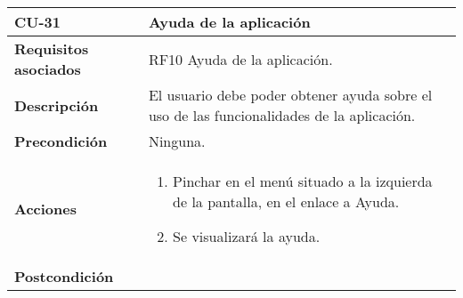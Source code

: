 \newpage
\begin{longtable}[t]{@{}ll@{}}
\toprule
\begin{minipage}[t]{0.23\columnwidth}\raggedright\strut
\textbf{CU-31}\strut
\end{minipage} & \begin{minipage}[b]{0.71\columnwidth}\raggedright\strut
\textbf{Ayuda de la aplicación}\strut
\end{minipage}\tabularnewline
\midrule
\endhead
\begin{minipage}[t]{0.23\columnwidth}\raggedright\strut
\textbf{Requisitos asociados}\strut
\end{minipage} & \begin{minipage}[t]{0.71\columnwidth}\raggedright\strut
RF10 Ayuda de la aplicación. \strut
\end{minipage}\tabularnewline
\begin{minipage}[t]{0.23\columnwidth}\raggedright\strut
\textbf{Descripción}\strut
\end{minipage} & \begin{minipage}[t]{0.71\columnwidth}\raggedright\strut
El usuario debe poder obtener ayuda sobre el uso de las funcionalidades de la aplicación.
\strut
\end{minipage}\tabularnewline
\begin{minipage}[t]{0.23\columnwidth}\raggedright\strut
\textbf{Precondición}\strut
\end{minipage} & \begin{minipage}[t]{0.71\columnwidth}\raggedright\strut
Ninguna.\strut
\end{minipage}\tabularnewline
\begin{minipage}[t]{0.23\columnwidth}\raggedright\strut
\textbf{Acciones}\strut
\end{minipage} & \begin{minipage}[t]{0.71\columnwidth}\raggedright\strut
\begin{enumerate}
\def\labelenumi{\arabic{enumi}.}
\tightlist
\item
Pinchar en el menú situado a la izquierda de la pantalla, en el
enlace a Ayuda.
\item
Se visualizará la ayuda.
\end{enumerate}\strut
\end{minipage}\tabularnewline
\begin{minipage}[t]{0.23\columnwidth}\raggedright\strut
\textbf{Postcondición}\strut
\end{minipage} & \begin{minipage}[t]{0.71\columnwidth}\raggedright\strut

\end{minipage}
\end{longtable}
